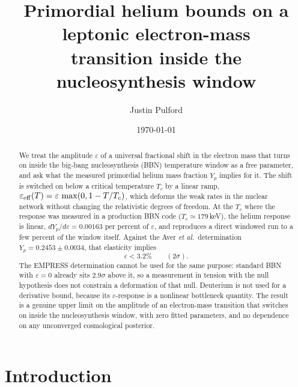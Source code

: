 \documentclass[aps,prd,twocolumn,superscriptaddress,nofootinbib,10pt]{revtex4-2}
\begin{document}
\title{Primordial helium bounds on a leptonic electron-mass\\
transition inside the nucleosynthesis window}

\author{Justin Pulford}

\date{\today}

\begin{abstract}
We treat the amplitude $\varepsilon$ of a universal fractional shift in the electron mass that
turns on inside the big-bang nucleosynthesis (BBN) temperature window as a free parameter, and ask
what the measured primordial helium mass fraction $Y_p$ implies for it. The shift is switched on
below a critical temperature $T_c$ by a linear ramp,
$\varepsilon_{\rm eff}(T)=\varepsilon\,\max(0,1-T/T_c)$, which deforms the weak rates in the
nuclear network without changing the relativistic degrees of freedom. At the $T_c$ where the
response was measured in a production BBN code ($T_c\simeq 179\,$keV), the helium response is
linear, $dY_p/d\varepsilon = 0.00163$ per percent of $\varepsilon$, and reproduces a direct
windowed run to a few percent of the window itself. Against the Aver \emph{et al.}\ determination
$Y_p=0.2453\pm 0.0034$, that elasticity implies
%
\begin{equation*}
  \varepsilon < 3.2\% \qquad (2\sigma).
\end{equation*}
%
The EMPRESS determination cannot be used for the same purpose: standard BBN with $\varepsilon=0$
already sits $2.9\sigma$ above it, so a measurement in tension with the null hypothesis does not
constrain a deformation of that null. Deuterium is not used for a derivative bound, because its
$\varepsilon$-response is a nonlinear bottleneck quantity. The result is a genuine upper limit on
the amplitude of an electron-mass transition that switches on inside the nucleosynthesis window,
with zero fitted parameters, and no dependence on any unconverged cosmological posterior.
\end{abstract}

\maketitle

\section{Introduction}\label{sec:intro}
\end{document}
